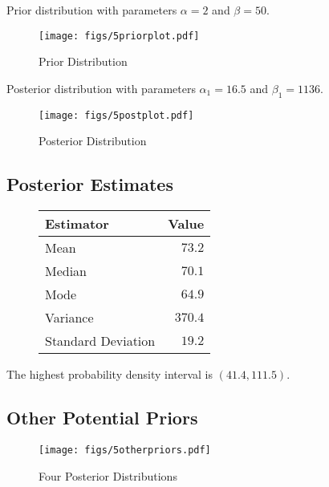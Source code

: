 \documentclass[12pt]{article}
\begin{document}
\noindent Prior distribution with parameters $\alpha=2$ and $\beta=50$.

\begin{figure}[H]
\begin{center}
\texttt{[image: figs/5priorplot.pdf]}
\caption{Prior Distribution}
\end{center}
\end{figure}

\noindent Posterior distribution with parameters $\alpha_1=16.5$ and $\beta_1=1136$.

\begin{figure}[H]
\begin{center}
\texttt{[image: figs/5postplot.pdf]}
\caption{Posterior Distribution}
\end{center}
\end{figure}

\subsection{Posterior Estimates}

\begin{figure}[H]
\begin{center}
\begin{tabular}{l|r}
Estimator & \multicolumn{1}{l}{Value} \\ \hline \hline
Mean               & $73.2$ \\
Median             & $70.1$ \\
Mode               & $64.9$ \\
Variance           & $370.4$ \\
Standard Deviation & $19.2$ \\
\end{tabular}
\end{center}
\end{figure}

The highest probability density interval is $(41.4, 111.5)$.

\subsection{Other Potential Priors}

\begin{figure}[H]
\begin{center}
\texttt{[image: figs/5otherpriors.pdf]}
\caption{Four Posterior Distributions}
\end{center}
\end{figure}
\end{document}
